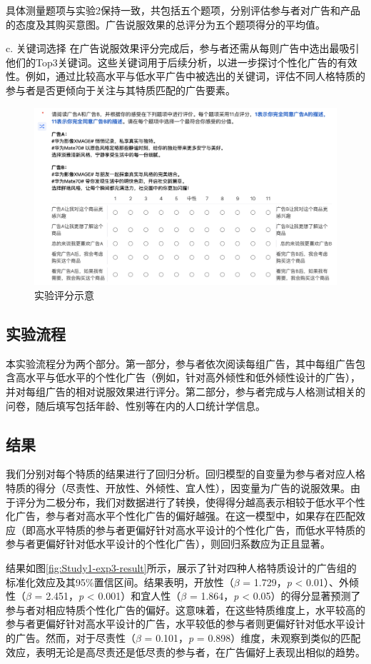 具体测量题项与实验2保持一致，共包括五个题项，分别评估参与者对广告和产品的态度及其购买意图。广告说服效果的总评分为五个题项得分的平均值。

c. 关键词选择
在广告说服效果评分完成后，参与者还需从每则广告中选出最吸引他们的Top3关键词。这些关键词用于后续分析，以进一步探讨个性化广告的有效性。例如，通过比较高水平与低水平广告中被选出的关键词，评估不同人格特质的参与者是否更倾向于关注与其特质匹配的广告要素。

\begin{figure}[H]
    \centering
    \includegraphics[width=.8\linewidth]{Image/Study1-exp3-rating.png}
    \caption{\label{fig:Study1-exp3-rating}实验评分示意}
\end{figure}


\subsection{实验流程}
本实验流程分为两个部分。第一部分，参与者依次阅读每组广告，其中每组广告包含高水平与低水平的个性化广告（例如，针对高外倾性和低外倾性设计的广告），并对每组广告的相对说服效果进行评分。第二部分，参与者完成与人格测试相关的问卷，随后填写包括年龄、性别等在内的人口统计学信息。

\subsection{结果}
我们分别对每个特质的结果进行了回归分析。回归模型的自变量为参与者对应人格特质的得分（尽责性、开放性、外倾性、宜人性），因变量为广告的说服效果。由于评分为二极分布，我们对数据进行了转换，使得得分越高表示相较于低水平个性化广告，参与者对高水平个性化广告的偏好越强。在这一模型中，如果存在匹配效应（即高水平特质的参与者更偏好针对高水平设计的个性化广告，而低水平特质的参与者更偏好针对低水平设计的个性化广告），则回归系数应为正且显著。

结果如图\ref{fig:Study1-exp3-result}所示，展示了针对四种人格特质设计的广告组的标准化效应及其95\%置信区间。结果表明，开放性（\textit{$\beta$} = 1.729，\textit{p} < 0.01）、外倾性（\textit{$\beta$} = 2.451，\textit{p} < 0.001）和宜人性（\textit{$\beta$} = 1.864，\textit{p} < 0.05）的得分显著预测了参与者对相应特质个性化广告的偏好。这意味着，在这些特质维度上，水平较高的参与者更偏好针对高水平设计的广告，水平较低的参与者则更偏好针对低水平设计的广告。然而，对于尽责性（\textit{$\beta$} = 0.101，\textit{p} = 0.898）维度，未观察到类似的匹配效应，表明无论是高尽责还是低尽责的参与者，在广告偏好上表现出相似的趋势。

